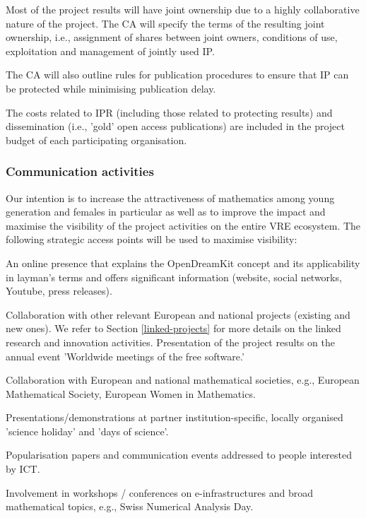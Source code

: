 Most of the project results will have joint ownership due to a highly collaborative nature of the project. The CA will specify the terms of the resulting joint ownership, i.e., assignment of shares between joint owners, conditions of use, exploitation and management of jointly used IP. 

The CA will also outline rules for publication procedures to ensure that IP can be protected while minimising publication delay.

The costs related to IPR (including those related to protecting results) and dissemination (i.e., 'gold' open access publications) are included in the project budget of each participating organisation. 

\subsubsection{Communication activities}
\label{subsubsect:communication}


Our intention is to increase the attractiveness of mathematics among young generation and females in particular as well as to improve the impact and maximise the visibility of the project activities on the entire VRE ecosystem. The following strategic access points will be used to maximise visibility:

\begin{compactenum}
\item An online presence that explains the OpenDreamKit concept and its applicability in layman's terms and offers significant information (website, social networks, Youtube, press releases).
\item Collaboration with other relevant European and national projects (existing and new ones). We refer to Section \ref{linked-projects} for more details on the linked research and innovation activities.  Presentation of the project results on the annual event 'Worldwide meetings of the free software.' 
\item Collaboration with European and national mathematical societies, e.g., European Mathematical Society, European Women in Mathematics.
\item Presentations/demonstrations at partner institution-specific, locally organised 'science holiday' and 'days of science'.
\item Popularisation papers and communication events addressed to people interested by ICT. 
\item Involvement in workshops / conferences on e-infrastructures and broad mathematical topics, e.g., Swiss Numerical Analysis Day.
\end{compactenum}

